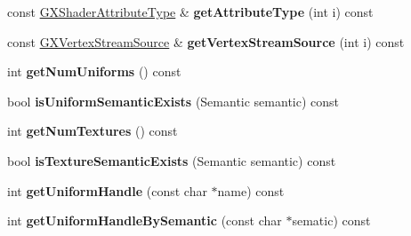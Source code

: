 \begin{DoxyCompactItemize}
\item 
const \hyperlink{class_i_dream_sky_1_1_g_x_shader_attribute_type}{G\+X\+Shader\+Attribute\+Type} \& {\bfseries get\+Attribute\+Type} (int i) const \hypertarget{class_i_dream_sky_1_1_visual_effect_1_1_data_afe039adcf4fad48ef697c5209e9e65c2}{}\label{class_i_dream_sky_1_1_visual_effect_1_1_data_afe039adcf4fad48ef697c5209e9e65c2}

\item 
const \hyperlink{class_i_dream_sky_1_1_g_x_vertex_stream_source}{G\+X\+Vertex\+Stream\+Source} \& {\bfseries get\+Vertex\+Stream\+Source} (int i) const \hypertarget{class_i_dream_sky_1_1_visual_effect_1_1_data_a960fe160589f815422f7f3201677df58}{}\label{class_i_dream_sky_1_1_visual_effect_1_1_data_a960fe160589f815422f7f3201677df58}

\item 
int {\bfseries get\+Num\+Uniforms} () const \hypertarget{class_i_dream_sky_1_1_visual_effect_1_1_data_a3e261312b07d88e2729674a3c0ac80e2}{}\label{class_i_dream_sky_1_1_visual_effect_1_1_data_a3e261312b07d88e2729674a3c0ac80e2}

\item 
bool {\bfseries is\+Uniform\+Semantic\+Exists} (Semantic semantic) const \hypertarget{class_i_dream_sky_1_1_visual_effect_1_1_data_ab0257da461348784299f565841ab3059}{}\label{class_i_dream_sky_1_1_visual_effect_1_1_data_ab0257da461348784299f565841ab3059}

\item 
int {\bfseries get\+Num\+Textures} () const \hypertarget{class_i_dream_sky_1_1_visual_effect_1_1_data_a4139d8d66db7c2b4694a2868d43a8301}{}\label{class_i_dream_sky_1_1_visual_effect_1_1_data_a4139d8d66db7c2b4694a2868d43a8301}

\item 
bool {\bfseries is\+Texture\+Semantic\+Exists} (Semantic semantic) const \hypertarget{class_i_dream_sky_1_1_visual_effect_1_1_data_a302003db04b17a41eab91107f623f58f}{}\label{class_i_dream_sky_1_1_visual_effect_1_1_data_a302003db04b17a41eab91107f623f58f}

\item 
int {\bfseries get\+Uniform\+Handle} (const char $\ast$name) const \hypertarget{class_i_dream_sky_1_1_visual_effect_1_1_data_ab24a1afbac359b73cd9e527cf6c1f396}{}\label{class_i_dream_sky_1_1_visual_effect_1_1_data_ab24a1afbac359b73cd9e527cf6c1f396}

\item 
int {\bfseries get\+Uniform\+Handle\+By\+Semantic} (const char $\ast$sematic) const \hypertarget{class_i_dream_sky_1_1_visual_effect_1_1_data_ada0b3e11a71d92f1dfa4547b75efa267}{}\label{class_i_dream_sky_1_1_visual_effect_1_1_data_ada0b3e11a71d92f1dfa4547b75efa267}


\end{DoxyCompactItemize}
